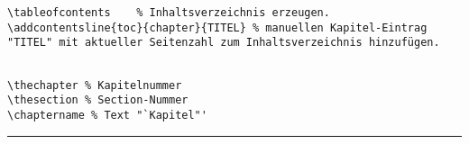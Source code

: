 	\negAbstand
		
\begin{lstlisting}
\tableofcontents	% Inhaltsverzeichnis erzeugen.
\addcontentsline{toc}{chapter}{TITEL} % manuellen Kapitel-Eintrag "TITEL" mit aktueller Seitenzahl zum Inhaltsverzeichnis hinzufügen.


\end{lstlisting}
\begin{lstlisting}
\thechapter % Kapitelnummer
\thesection % Section-Nummer
\chaptername % Text "`Kapitel"'
\end{lstlisting}

\hrule \vspace{0.5\baselineskip}
